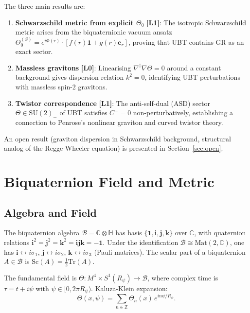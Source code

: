 \documentclass[11pt,a4paper]{article}
\theoremstyle{definition}
\theoremstyle{remark}
\newcommand{\Lzero}{\textbf{[L0]}}
\newcommand{\Lone}{\textbf{[L1]}}
\begin{document}
The three main results are:
\begin{enumerate}
  \item \textbf{Schwarzschild metric from explicit $\Theta_0$} \Lone:
        The isotropic Schwarzschild metric arises from the biquaternionic
        vacuum ansatz $\Theta_0^{(S)} = e^{i\Phi(r)}\cdot
        [f(r)\mathbf{1} + g(r)\boldsymbol{e}_r]$, proving that UBT contains
        GR as an exact sector.
  \item \textbf{Massless gravitons} \Lzero:
        Linearising $\nabla^\dagger\nabla\Theta = 0$ around a constant
        background gives dispersion relation $k^2 = 0$, identifying UBT
        perturbations with massless spin-2 gravitons.
  \item \textbf{Twistor correspondence} \Lone:
        The anti-self-dual (ASD) sector $\Theta \in \mathrm{SU}(2)_-$ of UBT
        satisfies $C^+ = 0$ non-perturbatively, establishing a connection
        to Penrose's nonlinear graviton and curved twistor theory.
\end{enumerate}

An open result (graviton dispersion in Schwarzschild background, structural
analog of the Regge-Wheeler equation) is presented in Section~\ref{sec:open}.

\section{Biquaternion Field and Metric}
\label{sec:field_metric}

\subsection{Algebra and Field}

The biquaternion algebra $\mathcal{B} = \mathbb{C}\otimes\mathbb{H}$
has basis $\{\mathbf{1}, \mathbf{i}, \mathbf{j}, \mathbf{k}\}$ over $\mathbb{C}$,
with quaternion relations $\mathbf{i}^2 = \mathbf{j}^2 = \mathbf{k}^2 =
\mathbf{i}\mathbf{j}\mathbf{k} = -\mathbf{1}$.
Under the identification $\mathcal{B} \cong \mathrm{Mat}(2,\mathbb{C})$,
one has $\mathbf{i} \leftrightarrow i\sigma_1$, $\mathbf{j} \leftrightarrow
i\sigma_2$, $\mathbf{k} \leftrightarrow i\sigma_3$ (Pauli matrices).
The scalar part of a biquaternion $A \in \mathcal{B}$ is
$\mathrm{Sc}(A) = \tfrac{1}{2}\mathrm{Tr}(A)$.

The fundamental field is $\Theta: M^4 \times S^1(R_\psi) \to \mathcal{B}$,
where complex time is $\tau = t + i\psi$ with $\psi \in [0, 2\pi R_\psi)$.
Kaluza-Klein expansion:
\begin{equation}
  \Theta(x, \psi) = \sum_{n\in\mathbb{Z}} \Theta_n(x)\,e^{in\psi/R_\psi}.
  \label{eq:kk_expansion}
\end{equation}
\end{document}
